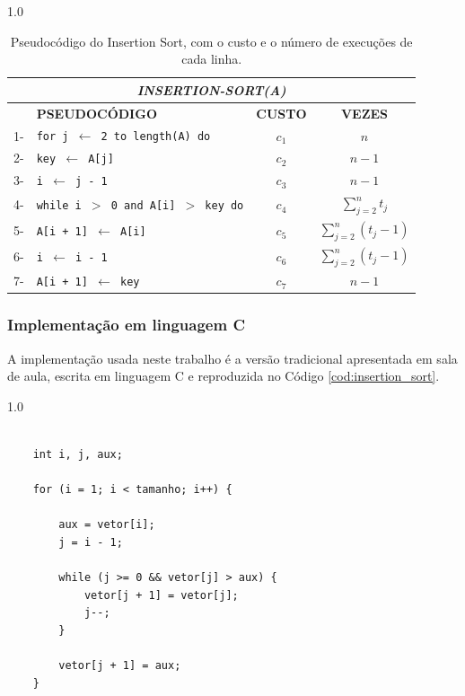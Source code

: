 \begin{spacing}{1.0}
	\begin{table}[H]
		\centering
		\caption{Pseudocódigo do Insertion Sort, com o custo e o número de execuções de cada linha.}
		\label{tab:custo_insertion}
		\renewcommand{\arraystretch}{1.3}
		\begin{tabular}{rlcc}
			\toprule
			\multicolumn{4}{c}{\textbf{\textit{INSERTION-SORT(A)}}} \\
			\midrule
			& \textbf{PSEUDOCÓDIGO} & \textbf{CUSTO} & \textbf{VEZES} \\
			\midrule
			1- & \texttt{for j $\leftarrow$ 2 to length(A) do} & $c_1$ & $n$ \\
			2- & \texttt{\hspace*{1em}key $\leftarrow$ A[j]} & $c_2$ & $n-1$ \\
			3- & \texttt{\hspace*{1em}i $\leftarrow$ j - 1} & $c_3$ & $n-1$ \\
			4- & \texttt{\hspace*{1em}while i $>$ 0 and A[i] $>$ key do} & $c_4$ & $\sum\limits_{j=2}^{n} t_j$ \\
			5- & \texttt{\hspace*{2em}A[i + 1] $\leftarrow$ A[i]} & $c_5$ & $\sum\limits_{j=2}^{n}(t_j - 1)$ \\
			6- & \texttt{\hspace*{2em}i $\leftarrow$ i - 1} & $c_6$ & $\sum\limits_{j=2}^{n}(t_j - 1)$ \\
			7- & \texttt{\hspace*{1em}A[i + 1] $\leftarrow$ key} & $c_7$ & $n-1$ \\
			\bottomrule
		\end{tabular}
	\end{table}
\end{spacing}

\subsubsection{Implementação em linguagem C}

\indent \qquad A implementação usada neste trabalho é a versão tradicional apresentada
em sala de aula, escrita em linguagem C e reproduzida no Código
\ref{cod:insertion_sort}.

\begin{spacing}{1.0}
\begin{lstlisting}[caption={Implementação do Insertion Sort em linguagem C.},label={cod:insertion_sort}]
	
    int i, j, aux;

    for (i = 1; i < tamanho; i++) {

        aux = vetor[i];
        j = i - 1;

        while (j >= 0 && vetor[j] > aux) {
            vetor[j + 1] = vetor[j];
            j--;
        }

        vetor[j + 1] = aux;
    }

\end{lstlisting}
\end{spacing}
